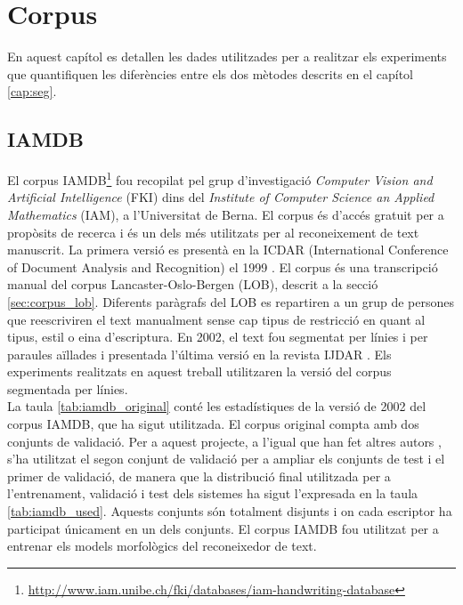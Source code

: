 \chapter{Corpus}
\label{cap:corpus}
En aquest capítol es detallen les dades utilitzades per a realitzar els experiments que quantifiquen les diferències entre els dos mètodes descrits en el capítol \ref{cap:seg}.

\section{IAMDB}\label{sec:corpus_iamdb}
El corpus IAMDB\footnote{\url{http://www.iam.unibe.ch/fki/databases/iam-handwriting-database}} fou recopilat pel grup d'investigació \emph{Computer Vision and Artificial Intelligence} (FKI) dins del \emph{Institute of Computer Science an Applied Mathematics} (IAM), a l'Universitat de Berna. El corpus és d'accés gratuit per a propòsits de recerca i és un dels més utilitzats per al reconeixement de text manuscrit. La primera versió es presentà en la ICDAR (International Conference of Document Analysis and Recognition) el 1999 \cite{MB99}. El corpus és una transcripció manual del corpus Lancaster-Oslo-Bergen (LOB), descrit a la secció \ref{sec:corpus_lob}. Diferents paràgrafs del LOB es repartiren a un grup de persones que reescriviren el text manualment sense cap tipus de restricció en quant al tipus, estil o eina d'escriptura. En 2002, el text fou segmentat per línies i per paraules aïllades \cite{ZB02} i presentada l'última versió en la revista IJDAR \cite{MB02}. Els experiments realitzats en aquest treball utilitzaren la versió del corpus segmentada per línies.\\

La taula \ref{tab:iamdb_original} conté les estadístiques de la versió de 2002 del corpus IAMDB, que ha sigut utilitzada. El corpus original compta amb dos conjunts de validació. Per a aquest projecte, a l'igual que han fet altres autors \cite{bertolami2008ensemble, graves2009novel, espana2011improving}, s'ha utilitzat el segon conjunt de validació per a ampliar els conjunts de test i el primer de validació, de manera que la distribució final utilitzada per a l'entrenament, validació i test dels sistemes ha sigut l'ex\-pre\-sa\-da en la taula \ref{tab:iamdb_used}. Aquests conjunts són totalment disjunts i on cada escriptor ha participat únicament en un dels conjunts. El corpus IAMDB fou utilitzat per a entrenar els models morfològics del reconeixedor de text.\\

